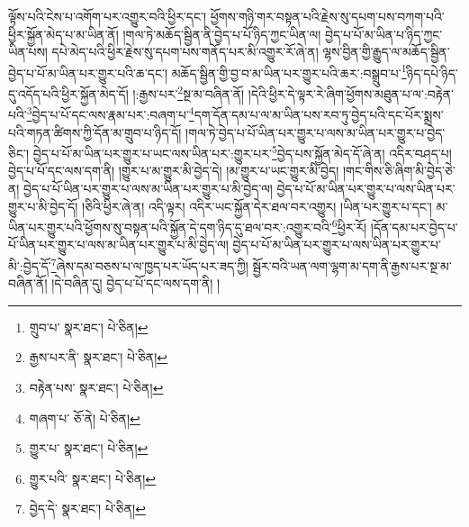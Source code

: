 ལྟོས་པའི་ངེས་པ་འགོག་པར་འགྱུར་བའི་ཕྱིར་དང་། ཕྱོགས་གཉི་གར་བསྟན་པའི་རྗེས་སུ་དཔག་པས་བཀག་པའི་ཕྱིར་སྐྱོན་མེད་པ་མ་ཡིན་ནོ། །གལ་ཏེ་མཆོད་སྦྱིན་ནི་བྱེད་པ་པོ་ཉིད་ཀྱང་ཡིན་ལ། བྱེད་པ་པོ་མ་ཡིན་པ་ཉིད་ཀྱང་ཡིན་པས། དཔེ་མེད་པའི་ཕྱིར་རྗེས་སུ་དཔག་པས་གནོད་པར་མི་འགྱུར་རོ་ཞེ་ན། ལྷས་བྱིན་གྱི་རྒྱུད་ལ་མཆོད་སྦྱིན་བྱེད་པ་པོ་མ་ཡིན་པར་གྱུར་པའི་ཆ་དང་། མཆོད་སྦྱིན་གྱི་བྱ་བ་མ་ཡིན་པར་གྱུར་པའི་ཆར་:བསྒྲུབ་པ་\footnote{གྲུབ་པ་  སྣར་ཐང་།  པེ་ཅིན། }ཉིད་དཔེ་ཉིད་དུ་འདོད་པའི་ཕྱིར་སྐྱོན་མེད་དོ། །:རྒྱས་པར་\footnote{རྒྱས་པར་ནི་  སྣར་ཐང་།  པེ་ཅིན། }སྔ་མ་བཞིན་ནོ། །དེའི་ཕྱིར་དེ་ལྟར་རེ་ཞིག་ཕྱོགས་མཐུན་པ་ལ་:བརྟེན་པའི་\footnote{བརྟེན་པས་  སྣར་ཐང་།  པེ་ཅིན། }བྱེད་པ་པོ་དང་ལས་རྣམ་པར་:བཞག་པ་\footnote{གཞག་པ་  ཅོ་ནེ།  པེ་ཅིན། }དག་དོན་དམ་པ་ལ་མ་ཡིན་པས་རབ་ཏུ་བྱེད་པའི་དང་པོར་སྨྲས་པའི་གཏན་ཚིགས་ཀྱི་དོན་མ་གྲུབ་པ་ཉིད་དོ། །གལ་ཏེ་བྱེད་པ་པོ་ཡིན་པར་གྱུར་པ་ལས་མ་ཡིན་པར་གྱུར་པ་བྱེད་ཅིང་། བྱེད་པ་པོ་མ་ཡིན་པར་གྱུར་པ་ཡང་ལས་ཡིན་པར་:གྱུར་པར་\footnote{གྱུར་པ་  སྣར་ཐང་།  པེ་ཅིན། }བྱེད་པས་སྐྱོན་མེད་དོ་ཞེ་ན། འདིར་བཤད་པ། བྱེད་པ་པོ་དང་ལས་དག་ནི། །གྱུར་པ་མ་གྱུར་མི་བྱེད་དེ། །མ་གྱུར་པ་ཡང་གྱུར་མི་བྱེད། །གང་གིས་ཅི་ཞིག་མི་བྱེད་ཅེ་ན། བྱེད་པ་པོ་ཡིན་པར་གྱུར་པ་ལས་མ་ཡིན་པར་གྱུར་པ་མི་བྱེད་ལ། བྱེད་པ་པོ་མ་ཡིན་པར་གྱུར་པ་ལས་ཡིན་པར་གྱུར་པ་མི་བྱེད་དོ། །ཅིའི་ཕྱིར་ཞེ་ན། འདི་ལྟར། འདིར་ཡང་སྐྱོན་དེར་ཐལ་བར་འགྱུར། །ཡིན་པར་གྱུར་པ་དང་། མ་ཡིན་པར་གྱུར་པའི་ཕྱོགས་སུ་བསྟན་པའི་སྐྱོན་དེ་དག་ཉིད་དུ་ཐལ་བར་:འགྱུར་བའི་\footnote{གྱུར་པའི་  སྣར་ཐང་།  པེ་ཅིན། }ཕྱིར་རོ། །དོན་དམ་པར་བྱེད་པ་པོ་ཡིན་པར་གྱུར་པ་ལས་མ་ཡིན་པར་གྱུར་པ་མི་བྱེད་ལ། བྱེད་པ་པོ་མ་ཡིན་པར་གྱུར་པ་ལས་ཡིན་པར་གྱུར་པ་མི་:བྱེད་དོ་\footnote{བྱེད་དེ་  སྣར་ཐང་།  པེ་ཅིན། }ཞེས་དམ་བཅས་པ་ལ་ཁྱད་པར་ཡོད་པར་ཟད་ཀྱི། སྦྱོར་བའི་ཡན་ལག་ལྷག་མ་དག་ནི་རྒྱས་པར་སྔ་མ་བཞིན་ནོ། །དེ་བཞིན་དུ། བྱེད་པ་པོ་དང་ལས་དག་ནི། །
